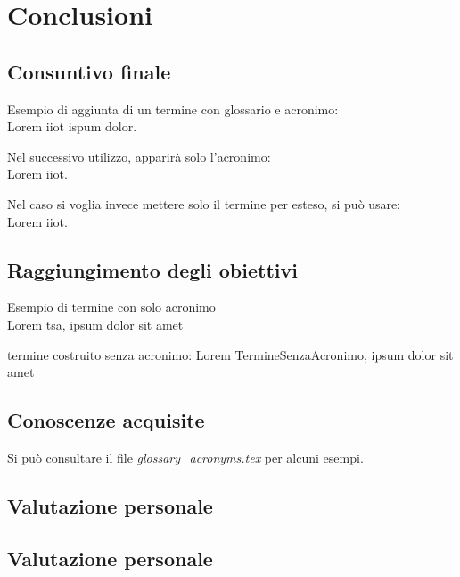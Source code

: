 \chapter{Conclusioni}
\label{chap:conclusioni}

\section{Consuntivo finale}
Esempio di aggiunta di un termine con glossario e acronimo:\\
Lorem \gls{iiot} ispum dolor.

Nel successivo utilizzo, apparirà solo l'acronimo:\\
Lorem \gls{iiot}.

Nel caso si voglia invece mettere solo il termine per esteso, si può usare:\\
Lorem \gls{iiot}.

\section{Raggiungimento degli obiettivi}
Esempio di termine con solo acronimo\\
Lorem \gls{tsa}, ipsum dolor sit amet

termine costruito senza acronimo:
Lorem \gls{TermineSenzaAcronimo}, ipsum dolor sit amet

\section{Conoscenze acquisite}

Si può consultare il file \textit{glossary\_acronyms.tex} per alcuni esempi.

\section{Valutazione personale}


\section{Valutazione personale}


\newpage